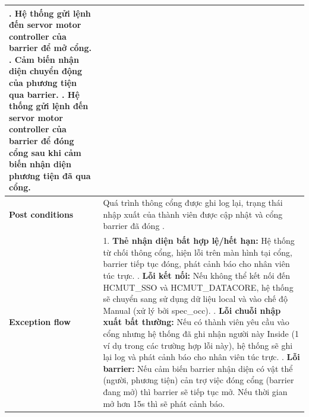 \begin{longtable}{|>{\centering\arraybackslash}m{3cm}|m{13.7cm}|}
7. Hệ thống gửi lệnh đến servor motor controller của barrier để mở cổng. \newline
8. Cảm biến nhận diện chuyển động của phương tiện qua barrier. \newline
9. Hệ thống gửi lệnh đến servor motor controller của barrier để đóng cổng sau khi cảm biến nhận diện phương tiện đã qua cổng. \\ \hline
\textbf{Post conditions} & Quá trình thông cổng được ghi log lại, trạng thái nhập xuất của thành viên được cập nhật và cổng barrier đã đóng . \\ \hline
\textbf{Exception flow} & 
1. \textbf{Thẻ nhận diện bất hợp lệ/hết hạn:} Hệ thống từ chối thông cổng, hiện lỗi trên màn hình tại cổng, barrier tiếp tục đóng, phát cảnh báo cho nhân viên túc trực. \newline
2. \textbf{Lỗi kết nối:} Nếu không thể kết nối đến HCMUT\_SSO và HCMUT\_DATACORE, hệ thống sẽ chuyển sang sử dụng dữ liệu local và vào chế độ Manual (xử lý bởi spec\_occ). \newline
3. \textbf{Lỗi chuỗi nhập xuất bất thường:} Nếu có thành viên yêu cầu vào cổng nhưng hệ thống đã ghi nhận người này Inside (1 ví dụ trong các trường hợp lỗi này), hệ thống sẽ ghi lại log và phát cảnh báo cho nhân viên túc trực. \newline
4. \textbf{Lỗi barrier:} Nếu cảm biến barrier nhận diện có vật thể (người, phương tiện) cản trợ việc đóng cổng (barrier đang mở) thì barrier sẽ tiếp tục mở. Nếu thời gian mở hơn 15s thì sẽ phát cảnh báo. \\ \hline
\end{longtable}
\endgroup

